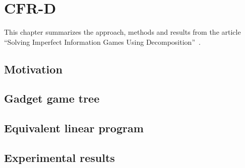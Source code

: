\chapter{CFR-D}

This chapter summarizes the approach, methods and results from the article ``Solving Imperfect Information Games Using Decomposition''~\cite{BurchJohansonBowling13}.

\section{Motivation}

\section{Gadget game tree}

\section{Equivalent linear program}

\section{Experimental results}
